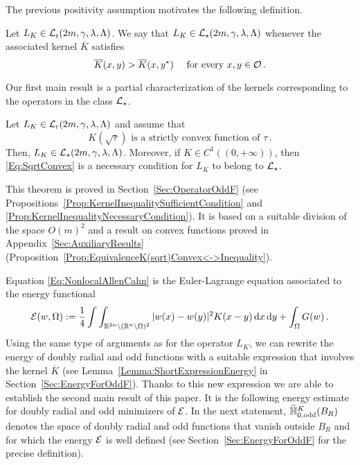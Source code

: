 The previous positivity assumption motivates the following definition.

\begin{definition}
	Let $L_K \in \mathcal{L}_{\mathrm{r}}(2m,\gamma,\lambda, \Lambda)$. We say that $L_K\in \mathcal{L}_\star (2m,\gamma,\lambda, \Lambda)$ whenever the associated kernel $\overline{K}$ satisfies
	\begin{equation}
		\label{Eq:KernelInequality}
		\overline{K}(x,y) > \overline{K}(x, y^\star) \quad \text{ for every }x,y \in \mathcal{O}\,.
	\end{equation}
\end{definition}

Our first main result is a partial characterization of the kernels corresponding to the operators in the class $\mathcal{L}_\star$.

\begin{theorem}
	\label{Th:CharacterizationLstar}
	Let $L_K \in \mathcal{L}_{\mathrm{r}}(2m,\gamma,\lambda, \Lambda)$ and assume that 
	\begin{equation}
		\label{Eq:SqrtConvex}	
		K(\sqrt{\tau}) \text{ is a strictly convex function of }\tau\,.
	\end{equation}
	Then, $L_K\in \mathcal{L}_\star(2m,\gamma,\lambda, \Lambda)$. Moreover, if $K\in C^1((0,+\infty))$, then \eqref{Eq:SqrtConvex} is a necessary condition for $L_K$ to belong to $\mathcal{L}_\star$.
\end{theorem}

This theorem is proved in Section~\ref{Sec:OperatorOddF} (see Propositions~\ref{Prop:KernelInequalitySufficientCondition} and \ref{Prop:KernelInequalityNecessaryCondition}). It is based on a suitable division of the space $O(m)^2$ and a result on convex functions proved in Appendix~\ref{Sec:AuxiliaryResults} (Proposition~\ref{Prop:EquivalenceK(sqrt)Convex<->Inequality}).

Equation \eqref{Eq:NonlocalAllenCahn} is the Euler-Lagrange equation associated to the energy functional
\begin{equation*}
\mathcal{E}(w, \Omega) := \dfrac{1}{4}\int\int_{\mathbb{R}^{2n} \setminus (\mathbb{R}^n\setminus\Omega)^2} |w(x) - w(y)|^2 K(x-y) \,\mathrm{d} x \,\mathrm{d} y + \int_{\Omega} G(w)\,.
\end{equation*}
Using the same type of arguments as for the operator $L_K$, we can rewrite the energy of doubly radial and odd functions with a suitable expression that involves the kernel $\overline{K}$ (see Lemma~\ref{Lemma:ShortExpressionEnergy} in  Section~\ref{Sec:EnergyForOddF}). Thanks to this new expression we are able to establish the second main result of this paper. It is the following energy estimate for doubly radial and odd minimizers of $\mathcal{E}$. In the next statement, $\widetilde{\mathbb{H}}^K_{0, \mathrm{odd}}(B_R)$ denotes the space of doubly radial and odd functions that vanish outside $B_R$ and for which the energy $\mathcal{E}$ is well defined (see Section~\ref{Sec:EnergyForOddF} for the precise definition).

